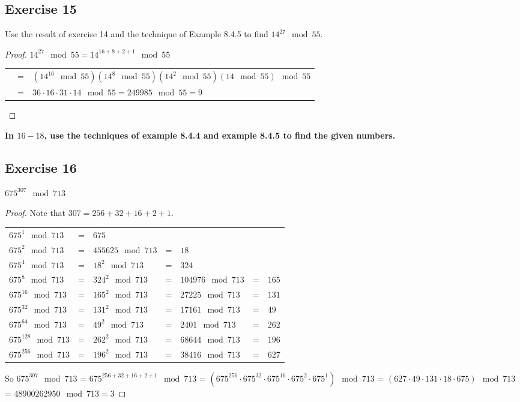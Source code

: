 \documentclass[14pt]{extarticle}
\newcommand{\cy}{\color{cyan}}
\begin{document}
\subsection{Exercise 15}
Use the result of exercise 14 and the technique of Example 8.4.5 to find \(14^{27} \mod 55\).

\begin{proof}
        \(14^{27} \mod 55 = 14^{16+8+2+1} \mod 55\)

        \begin{tabular}{rcl}
                 & = & \((14^{16} \mod 55)(14^8 \mod 55)(14^2 \mod 55)(14 \mod 55) \mod 55\) \\
                 & = & \(36 \cdot 16 \cdot 31 \cdot 14 \mod 55 = 249985 \mod 55 = 9\)
        \end{tabular}
\end{proof}

{\bf \cy In $16-18$, use the techniques of example 8.4.4 and example 8.4.5 to find the given numbers.}

\subsection{Exercise 16}
\(675^{307} \mod 713\)

\begin{proof}
        Note that \(307 = 256 + 32 + 16 + 2 + 1\).

        \begin{tabular}{lclclcl}
                \(675^1 \mod 713\)     & = & \(675\)                                                     \\
                \(675^2 \mod 713\)     & = & \(455625 \mod 713\) & = & \(18\)                            \\
                \(675^4 \mod 713\)     & = & \(18^2 \mod 713\)   & = & \(324\)                           \\
                \(675^8 \mod 713\)     & = & \(324^2 \mod 713\)  & = & \(104976 \mod 713\) & = & \(165\) \\
                \(675^{16} \mod 713\)  & = & \(165^2 \mod 713\)  & = & \(27225 \mod 713\)  & = & \(131\) \\
                \(675^{32} \mod 713\)  & = & \(131^2 \mod 713\)  & = & \(17161 \mod 713\)  & = & \(49\)  \\
                \(675^{64} \mod 713\)  & = & \(49^2 \mod 713\)   & = & \(2401 \mod 713\)   & = & \(262\) \\
                \(675^{128} \mod 713\) & = & \(262^2 \mod 713\)  & = & \(68644 \mod 713\)  & = & \(196\) \\
                \(675^{256} \mod 713\) & = & \(196^2 \mod 713\)  & = & \(38416 \mod 713\)  & = & \(627\)
        \end{tabular}

        So \(675^{307} \mod 713\) = \(675^{256 + 32 + 16 + 2 + 1} \mod 713\) = \((675^{256} \cdot 675^{32} \cdot 675^{16}
        \cdot 675^{2} \cdot 675^{1}) \mod 713\) = \((627 \cdot 49 \cdot 131 \cdot 18 \cdot 675) \mod 713\) = \(48900262950
        \mod 713 = 3\)
\end{proof}
\end{document}
